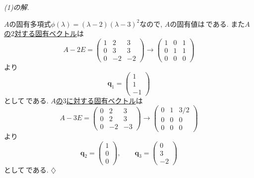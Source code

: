 \documentclass[titlepage]{jsarticle}
\numberwithin{equation}{section}
\newenvironment{kaitou}[1][解]{%
\begin{proofbox}%
\textit{#1. }\ignorespaces
}{%
\hfill$\diamondsuit$%
\end{proofbox}%
}
\begin{document}
\begin{kaitou}[(1)の解]
$A$の固有多項式$\phi(\lambda) = (\lambda-2)(\lambda-3)^2$なので, $A$の固有値は\,である. また\uline{$A$の$2$対する固有ベクトル}は
\[
A - 2E = 
\begin{pmatrix}
1 & 2 & 3\\
0 & 3 & 3\\
0 & -2 & -2  
\end{pmatrix}
\to 
\begin{pmatrix}
1 & 0 & 1\\
0 & 1 & 1\\
0 & 0 & 0
\end{pmatrix}
\]
より
\[
\bm{q}_1 = 
\begin{pmatrix}
1\\
1\\
-1
\end{pmatrix}
\]
として\,である. \uline{$A$の$3$に対する固有ベクトル}は
\[
A - 3E =
\begin{pmatrix}
0 & 2 & 3\\
0 & 2 & 3\\
0 & -2 & -3
\end{pmatrix}
\to
\begin{pmatrix}
0 & 1 & 3/2\\
0 & 0 & 0\\
0 & 0 & 0
\end{pmatrix}
\]
より
\[
\bm{q}_2 =
\begin{pmatrix}
1\\
0\\
0
\end{pmatrix}, \qquad
\bm{q}_3 =
\begin{pmatrix}
0\\
3\\
-2
\end{pmatrix}
\]
として\,である. 
\end{kaitou}
\end{document}
